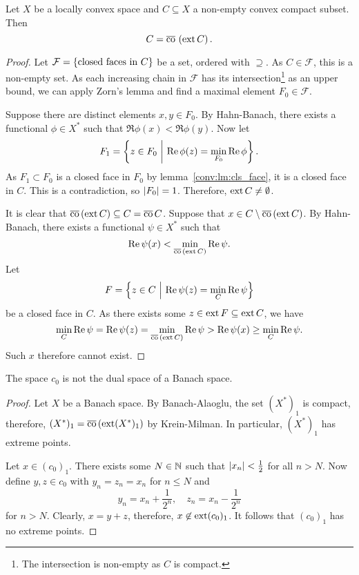 \begin{izrek}
Let $X$ be a locally convex space and $C \subseteq X$ a non-empty
convex compact subset. Then
\[
C = \overline{\operatorname{co}}\, \left(\operatorname{ext} C\right).
\]
\end{izrek}


\begin{proof}
Let $\mathcal{F} = \left\{\text{closed faces in $C$}\right\}$ be a set,
ordered with $\supseteq$. As $C \in \mathcal{F}$, this is a
non-empty set. As each increasing chain in $\mathcal{F}$ has its
intersection\footnote{The intersection is non-empty as $C$ is
compact.} as an upper bound, we can apply Zorn's lemma and find a
maximal element $F_0 \in \mathcal{F}$.

Suppose there are distinct elements $x, y \in F_0$. By Hahn-Banach,
there exists a functional $\phi \in X^*$ such that
$\Re \phi(x) < \Re \phi(y)$. Now let
\[
F_1 = \left\{z \in F_0~\middle\vert~\operatorname{Re} \phi(z) = \min_{F_0} \operatorname{Re} \phi\right\}.
\]
As $F_1 \subset F_0$ is a closed face in $F_0$ by
lemma~\ref{conv:lm:cls_face}, it is a closed face in $C$. This is a
contradiction, so $\left\lvert F_0\right\rvert = 1$. Therefore,
$\operatorname{ext} C \ne \emptyset$.

It is clear that
$\overline{\operatorname{co}}\,(\operatorname{ext} C) \subseteq C = \overline{\operatorname{co}}\,C$. Suppose that
$x \in C \setminus \overline{\operatorname{co}}\,(\operatorname{ext} C)$. By Hahn-Banach, there
exists a functional $\psi \in X^*$ such that
\[
\operatorname{Re} \psi(x) < \min_{\overline{\operatorname{co}}\,(\operatorname{ext} C)} \operatorname{Re} \psi.
\]
Let
\[
F = \left\{z \in C~\middle\vert~\operatorname{Re} \psi(z) = \min_C \operatorname{Re} \psi\right\}
\]
be a closed face in $C$. As there exists some
$z \in \operatorname{ext} F \subseteq \operatorname{ext} C$, we have
\[
\min_C \operatorname{Re} \psi =
\operatorname{Re} \psi(z) =
\min_{\overline{\operatorname{co}}\,(\operatorname{ext} C)} \operatorname{Re} \psi >
\operatorname{Re} \psi(x) \geq
\min_C \operatorname{Re} \psi.
\]
Such $x$ therefore cannot exist.
\end{proof}

\begin{trditev}
The space $c_0$ is not the dual space of a Banach space.
\end{trditev}

\begin{proof}
Let $X$ be a Banach space. By Banach-Alaoglu, the set $(X^*)_1$ is
compact, therefore, $(X^*)_1 = \overline{\operatorname{co}}\,(\operatorname{ext} (X^*)_1)$ by
Krein-Milman. In particular, $(X^*)_1$ has extreme points.

Let $x \in (c_0)_1$. There exists some $N \in \mathbb{N}$ such that
$\left\lvert x_n\right\rvert < \frac{1}{2}$ for all $n > N$. Now define
$y, z \in c_0$ with $y_n = z_n = x_n$ for $n \leq N$ and
\[
y_n = x_n + \frac{1}{2^n}, \quad z_n = x_n - \frac{1}{2^n}
\]
for $n > N$. Clearly, $x = y + z$, therefore,
$x \not \in \operatorname{ext} (c_0)_1$. It follows that $(c_0)_1$ has no extreme
points.
\end{proof}

